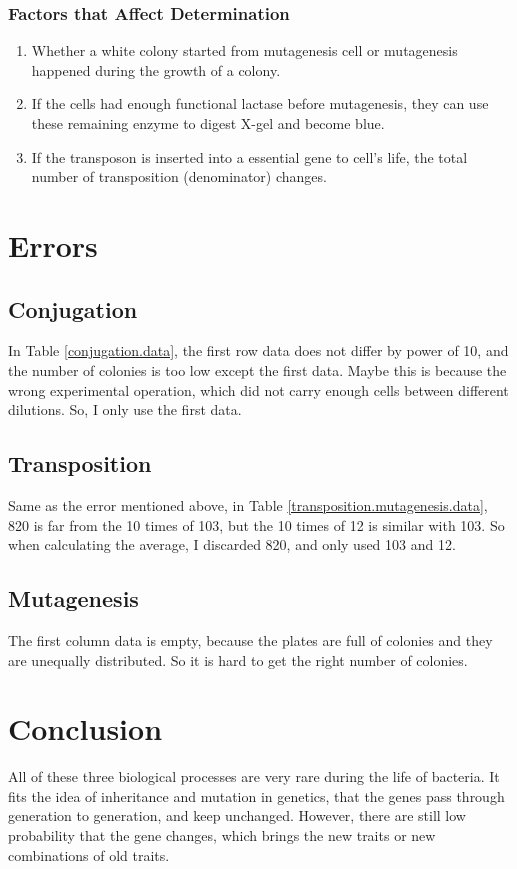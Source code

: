 \documentclass{article}
\begin{document}
			\subsubsection{Factors that Affect Determination}
				\begin{enumerate}
					\item Whether a white colony started from mutagenesis cell or mutagenesis happened during the growth of a colony.
					\item If the cells had enough functional lactase before mutagenesis, they can use these remaining enzyme to digest X-gel and become blue.
					\item If the transposon is inserted into a essential gene to cell's life, the total number of transposition (denominator) changes.
				\end{enumerate}
	\section{Errors}
		\subsection{Conjugation}
			In Table \ref{conjugation.data}, the first row data does not differ by power of 10, and the number of colonies is too low except the first data. Maybe this is because the wrong experimental operation, which did not carry enough cells between different dilutions. So, I only use the first data.
		\subsection{Transposition}
			Same as the error mentioned above, in Table \ref{transposition.mutagenesis.data}, 820 is far from the 10 times of 103, but the 10 times of 12 is similar with 103. So when calculating the average, I discarded 820, and only used 103 and 12.
		\subsection{Mutagenesis}
			The first column data is empty, because the plates are full of colonies and they are unequally distributed. So it is hard to get the right number of colonies.

	\section{Conclusion}
		All of these three biological processes are very rare during the life of bacteria. It fits the idea of inheritance and mutation in genetics, that the genes pass through generation to generation, and keep unchanged. However, there are still low probability that the gene changes, which brings the new traits or new combinations of old traits. 
\end{document}
